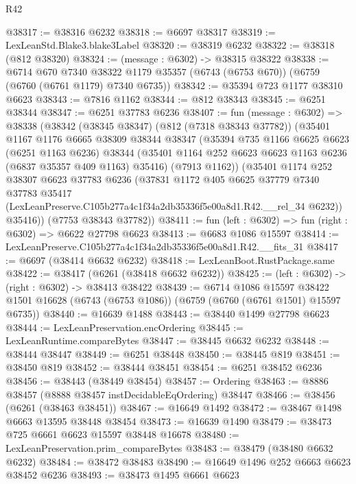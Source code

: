 \begin{lexlean}{R42}
\begin{coremodule}
{@38317 := @38316 @6232
@38318 := @6697 @38317
@38319 := LexLeanStd.Blake3.blake3Label
@38320 := @38319 @6232
@38322 := @38318 (@812 @38320)
@38324 := (message : @6302) -> @38315 @38322
@38338 := @6714
    @670
    @7340
    @38322
    @1179
    @35357
    (@6743 (@6753 @670))
    (@6759 (@6760 (@6761 @1179) @7340 @6735))
@38342 := @35394 @723 @1177 @38310 @6623
@38343 := @7816 @1162
@38344 := @812 @38343
@38345 := @6251 @38344
@38347 := @6251 @37783 @6236
@38407 := fun (message : @6302) =>
  @38338
    (@38342
      (@38345 @38347)
      (@812 (@7318 @38343 @37782))
      (@35401
        @1167
        @1176
        @6665
        @38309
        @38344
        @38347
        (@35394
          @735
          @1166
          @6625
          @6623
          (@6251 @1163 @6236)
          @38344
          (@35401 @1164 @252 @6623 @6623 @1163 @6236 (@6837 @35357 @409 @1163) @35416)
          (@7913 @1162))
        (@35401
          @1174
          @252
          @38307
          @6623
          @37783
          @6236
          (@37831
            @1172
            @405
            @6625
            @37779
            @7340
            @37783
            @35417
            (LexLeanPreserve.C105b277a4c1f34a2db35336f5e00a8d1.R42.__rel_34 @6232))
          @35416))
      (@7753 @38343 @37782))
@38411 := fun (left : @6302) => fun (right : @6302) => @6622 @27798 @6623
@38413 := @6683 @1086 @15597
@38414 := LexLeanPreserve.C105b277a4c1f34a2db35336f5e00a8d1.R42.__fits_31
@38417 := @6697 (@38414 @6632 @6232)
@38418 := LexLeanBoot.RustPackage.same
@38422 := @38417 (@6261 (@38418 @6632 @6232))
@38425 := (left : @6302) -> (right : @6302) -> @38413 @38422
@38439 := @6714
    @1086
    @15597
    @38422
    @1501
    @16628
    (@6743 (@6753 @1086))
    (@6759 (@6760 (@6761 @1501) @15597 @6735))
@38440 := @16639 @1488
@38443 := @38440 @1499 @27798 @6623
@38444 := LexLeanPreservation.encOrdering
@38445 := LexLeanRuntime.compareBytes
@38447 := @38445 @6632 @6232
@38448 := @38444 @38447
@38449 := @6251 @38448
@38450 := @38445 @819
@38451 := @38450 @819
@38452 := @38444 @38451
@38454 := @6251 @38452 @6236
@38456 := @38443 (@38449 @38454)
@38457 := Ordering
@38463 := @8886 @38457 (@8888 @38457 instDecidableEqOrdering) @38447
@38466 := @38456 (@6261 (@38463 @38451))
@38467 := @16649 @1492
@38472 := @38467 @1498 @6663 @13595 @38448 @38454
@38473 := @16639 @1490
@38479 := @38473 @725 @6661 @6623 @15597 @38448 @16678
@38480 := LexLeanPreservation.prim_compareBytes
@38483 := @38479 (@38480 @6632 @6232)
@38484 := @38472 @38483
@38490 := @16649 @1496 @252 @6663 @6623 @38452 @6236
@38493 := @38473 @1495 @6661 @6623
}
\end{coremodule}
\end{lexlean}
